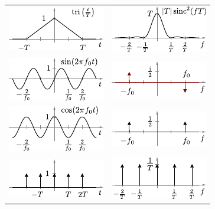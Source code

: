 \documentclass[fs, footer]{latex4ei}
\begin{document}
\begin{multicols*}{4}
{\begin{tabular*}{\columnwidth}{c@{\extracolsep\fill}c}
		\includegraphics{./img/FT/tri_t.pdf} & \includegraphics{./img/FT/tri_f.pdf}\\[1em]
		\includegraphics{./img/FT/sin_t.pdf} & \includegraphics{./img/FT/sin_f.pdf}\\[1em]
		\includegraphics{./img/FT/cos_t.pdf} & \includegraphics{./img/FT/cos_f.pdf}\\[1em]
		\includegraphics{./img/FT/dirac_folge_t.pdf} & \includegraphics{./img/FT/dirac_folge_f.pdf}\\[1em]
	\end{tabular*}



}
\end{multicols*}
\end{document}

